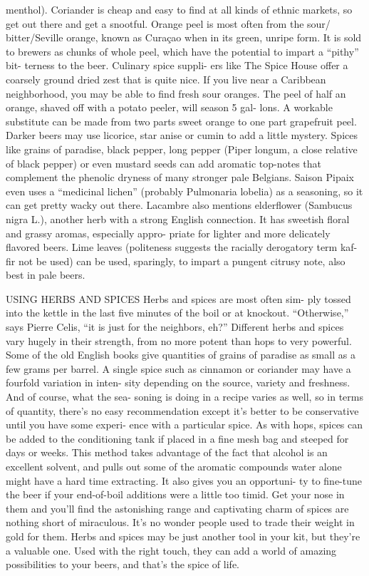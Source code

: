 \documentclass[a4paper,parskip=half]{scrartcl}
\begin{document}
menthol). Coriander is cheap and easy to
find at all kinds of ethnic markets, so get
out there and get a snootful.
Orange peel is most often from the sour/
bitter/Seville orange, known as Curaçao
when in its green, unripe form. It is sold
to brewers as chunks of whole peel, which
have the potential to impart a “pithy” bit-
terness to the beer. Culinary spice suppli-
ers like The Spice House offer a coarsely
ground dried zest that is quite nice. If you
live near a Caribbean neighborhood, you
may be able to find fresh sour oranges.
The peel of half an orange, shaved off
with a potato peeler, will season 5 gal-
lons. A workable substitute can be made
from two parts sweet orange to one part
grapefruit peel.
Darker beers may use licorice, star anise
or cumin to add a little mystery. Spices
like grains of paradise, black pepper, long
pepper (Piper longum, a close relative of
black pepper) or even mustard seeds can
add aromatic top-notes that complement
the phenolic dryness of many stronger
pale Belgians. Saison Pipaix even uses a
“medicinal lichen” (probably Pulmonaria
lobelia) as a seasoning, so it can get pretty
wacky out there.
Lacambre also mentions elderflower
(Sambucus nigra L.), another herb with a
strong English connection. It has sweetish
floral and grassy aromas, especially appro-
priate for lighter and more delicately
flavored beers. Lime leaves (politeness
suggests the racially derogatory term kaf-
fir not be used) can be used, sparingly, to
impart a pungent citrusy note, also best
in pale beers.

\parencite[32]{Mosher2010}
USING HERBS AND SPICES
Herbs and spices are most often sim-
ply tossed into the kettle in the last
five minutes of the boil or at knockout.
“Otherwise,” says Pierre Celis, “it is just
for the neighbors, eh?” Different herbs
and spices vary hugely in their strength,
from no more potent than hops to very
powerful. Some of the old English books
give quantities of grains of paradise as
small as a few grams per barrel. A single
spice such as cinnamon or coriander
may have a fourfold variation in inten-
sity depending on the source, variety and
freshness. And of course, what the sea-
soning is doing in a recipe varies as well,
so in terms of quantity, there’s no easy
recommendation except it’s better to be
conservative until you have some experi-
ence with a particular spice.
As with hops, spices can be added to the
conditioning tank if placed in a fine mesh
bag and steeped for days or weeks. This
method takes advantage of the fact that
alcohol is an excellent solvent, and pulls
out some of the aromatic compounds
water alone might have a hard time
extracting. It also gives you an opportuni-
ty to fine-tune the beer if your end-of-boil
additions were a little too timid.
Get your nose in them and you’ll find the
astonishing range and captivating charm
of spices are nothing short of miraculous.
It’s no wonder people used to trade their
weight in gold for them. Herbs and spices
may be just another tool in your kit, but
they’re a valuable one. Used with the right
touch, they can add a world of amazing
possibilities to your beers, and that’s the
spice of life.
\end{document}
